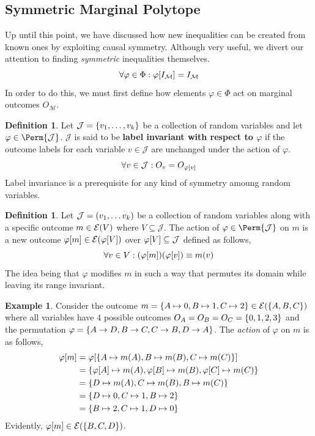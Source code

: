 \documentclass[aps, 10pt, english, twoside, pra, nofootinbib, longbibliography]{revtex4-1}
\theoremstyle{plain}
\theoremstyle{definition}
\newtheorem{definition}[theorem]{Definition}
\newtheorem{example}[theorem]{Example}
\theoremstyle{remark}
\newcommand{\gep}{\varphi}
\newcommand{\gp}{\Phi}
\newcommand{\mscenario}{\mathcal{M}}
\newcommand{\jointvar}{\mathcal{J}}
\newcommand{\term}[1]{\textcolor{Mahogany}{\textbf{#1}}}
\newcommand{\Events}[1]{\s{E}\br{#1}} %
\begin{document}
    \subsection{Symmetric Marginal Polytope}
    Up until this point, we have discussed how new inequalities can be created from known ones by exploiting causal symmetry. Although very useful, we divert our attention to finding \textit{symmetric} inequalities themselves.
    \[ \forall \gep \in \gp :  \gep\bs{I_{\mscenario}} = I_{\mscenario} \]
    In order to do this, we must first define how elements $\gep \in \gp$ act on marginal outcomes $O_{\mscenario}$.
    \begin{definition}
        Let $\jointvar = \bc{v_1, \ldots, v_k}$ be a collection of random variables and let $\gep \in \Perm{\jointvar}$. $\jointvar$ is said to be \term{label invariant with respect to $\gep$} if the outcome labels for each variable $v \in \jointvar$ are unchanged under the action of $\gep$.
        \[ \forall v \in \jointvar : O_{v} = O_{\gep\bs{v}} \]
        Label invariance is a prerequisite for any kind of symmetry amoung random variables.
    \end{definition}
    \begin{definition}
        Let $\jointvar = \br{v_1, \ldots v_k}$ be a collection of random variables along with a specific outcome $m \in \Events{V}$ where $V \subseteq \jointvar$. The action of $\gep \in \Perm{\jointvar}$ on $m$ is a new outcome $\gep\bs{m} \in \Events{\gep\bs{V}}$ over $\gep\bs{V} \subseteq \jointvar$ defined as follows,
        \[ \forall v \in V : \br{\gep\bs{m}}\br{\gep\bs{v}} \defined m \br{v} \]
        The idea being that $\gep$ modifies $m$ in such a way that permutes its domain while leaving its range invariant.
    \end{definition}
    \begin{example}
        Consider the outcome $m = \bc{A \mapsto 0, B \mapsto 1, C \mapsto 2} \in \Events{\bc{A,B,C}}$ where all variables have $4$ possible outcomes $O_A = O_B = O_C = \bc{0,1,2,3}$ and the permutation $\gep = \bc{A \to D, B \to C, C \to B, D \to A}$.
        The \textit{action} of $\gep$ on $m$ is as follows,
        \begin{align*}
            \gep\bs{m} &= \gep\bs{\bc{A \mapsto m\br{A}, B \mapsto m\br{B}, C \mapsto m\br{C}}} \\
            &= \bc{\gep\bs{A} \mapsto m\br{A}, \gep\bs{B} \mapsto m\br{B}, \gep\bs{C} \mapsto m\br{C}} \\
            &= \bc{D \mapsto m\br{A}, C \mapsto m\br{B}, B \mapsto m\br{C}} \\
            &= \bc{D \mapsto 0, C \mapsto 1, B \mapsto 2} \\
            &= \bc{B \mapsto 2, C \mapsto 1, D \mapsto 0}
        \end{align*}
        Evidently, $\gep\bs{m} \in \Events{\bc{B, C, D}}$.
    \end{example}
\end{document}
